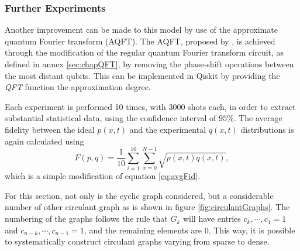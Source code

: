\documentclass[../../dissertation.tex]{subfiles}
\begin{document}
\subsubsection{Further Experiments}
Another improvement can be made to this model by use of the approximate quantum Fourier transform (AQFT). The AQFT, proposed by \cite{Coppersmith94}, is achieved through the modification of the regular quantum Fourier transform circuit, as defined in annex \ref{sec:chapQFT}, by removing the phase-shift operations between the most distant qubits. This can be implemented in Qiskit by providing the \textit{QFT} function the approximation degree.\par
Each experiment is performed 10 times, with $3000$ shots each, in order to extract substantial statistical data, using the confidence interval of $95\%$. The average fidelity between the ideal $p(x,t)$ and the experimental $q(x,t)$ distributions is again calculated using
\begin{equation}
    F(p,q) = \frac{1}{10}\sum_{i = 1}^{10} \sum_{x=0}^{N-1} \sqrt{p(x,t)q(x,t)},
    \label{eq:avgFid}
\end{equation}
which is a simple modification of equation \ref{eq:avgFid}.\par
For this section, not only is the cyclic graph considered, but a considerable number of other circulant graph as is shown in figure \ref{fig:circulantGraphs}. The numbering of the graphs follows the rule that $G_k$ will have entries $c_k, \cdots, c_1 = 1$ and $c_{n-k},\cdots,c_{n-1} = 1$, and the remaining elements are $0$. This way, it is possible to systematically construct circulant graphs varying from sparse to dense.  
\end{document}
